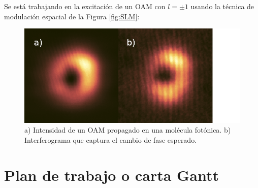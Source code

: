 \documentclass{article}
\begin{document}
Se está trabajando en la excitación de un OAM con $l = \pm 1$ usando la técnica de modulación espacial de la Figura \ref{fig:SLM}:

\begin{figure}[H]
	\centering
	\includegraphics[width=0.7\linewidth]{./media/vortex.png}
	\caption{a) Intensidad de un OAM propagado en una molécula fotónica. b) Interferograma que captura el cambio de fase esperado.}
\end{figure}

\section{Plan de trabajo o carta Gantt}


\renewcommand\refname{Referencias}


\end{document}
